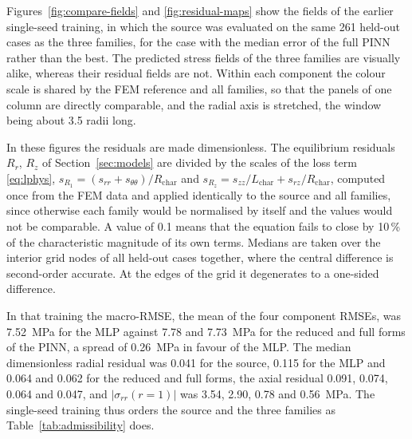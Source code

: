 Figures~\ref{fig:compare-fields} and \ref{fig:residual-maps} show the fields of the earlier single-seed training, in which the source was evaluated on the same 261 held-out cases as the three families, for the case with the median error of the full PINN rather than the best. The predicted stress fields of the three families are visually alike, whereas their residual fields are not. Within each component the colour scale is shared by the FEM reference and all families, so that the panels of one column are directly comparable, and the radial axis is stretched, the window being about 3.5 radii long.

In these figures the residuals are made dimensionless. The equilibrium residuals $R_r$, $R_z$ of Section~\ref{sec:models} are divided by the scales of the loss term \eqref{eq:lphys}, $s_{R_1}=(s_{rr}+s_{\theta\theta})/R_{\mathrm{char}}$ and $s_{R_z}=s_{zz}/L_{\mathrm{char}}+s_{rz}/R_{\mathrm{char}}$, computed once from the FEM data and applied identically to the source and all families, since otherwise each family would be normalised by itself and the values would not be comparable. A value of 0.1 means that the equation fails to close by 10\,\% of the characteristic magnitude of its own terms. Medians are taken over the interior grid nodes of all held-out cases together, where the central difference is second-order accurate. At the edges of the grid it degenerates to a one-sided difference.

In that training the macro-RMSE, the mean of the four component RMSEs, was 7.52~MPa for the MLP against 7.78 and 7.73~MPa for the reduced and full forms of the PINN, a spread of 0.26~MPa in favour of the MLP. The median dimensionless radial residual was 0.041 for the source, 0.115 for the MLP and 0.064 and 0.062 for the reduced and full forms, the axial residual 0.091, 0.074, 0.064 and 0.047, and $|\sigma_{rr}(r{=}1)|$ was 3.54, 2.90, 0.78 and 0.56~MPa. The single-seed training thus orders the source and the three families as Table~\ref{tab:admissibility} does. %

